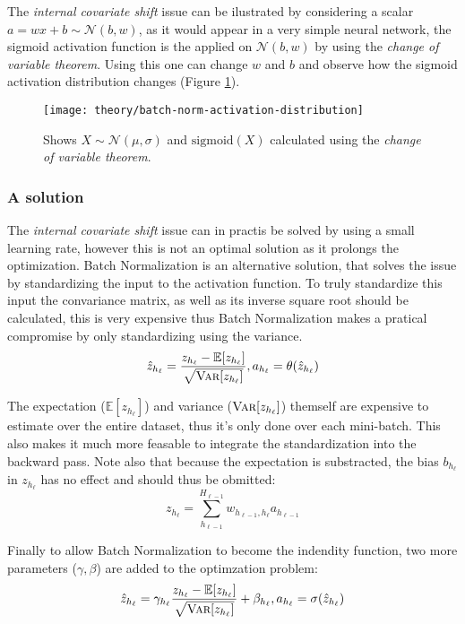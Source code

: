 The \textit{internal covariate shift} issue can be ilustrated by considering a scalar $a = w x + b \sim \mathcal{N}(b, w)$, as it would appear in a very simple neural network, the sigmoid activation function is the applied on $\mathcal{N}(b, w)$ by using the \textit{change of variable theorem}. Using this one can change $w$ and $b$ and observe how the sigmoid activation distribution changes (Figure \ref{fig:batch-norm-activation-distribution}).

\begin{figure}[h]
	\centering
	\texttt{[image: theory/batch-norm-activation-distribution]}
	\caption{Shows $X \sim \mathcal{N}(\mu, \sigma)$ and $\mathrm{sigmoid}(X)$ calculated using the \textit{change of variable theorem}.}
	\label{fig:batch-norm-activation-distribution}
\end{figure}

\subsubsection{A solution}
The \textit{internal covariate shift} issue can in practis be solved by using a small learning rate, however this is not an optimal solution as it prolongs the optimization. Batch Normalization is an alternative solution, that solves the issue by standardizing the input to the activation function. To truly standardize this input the convariance matrix, as well as its inverse square root should be calculated, this is very expensive thus Batch Normalization makes a pratical compromise by only standardizing using the variance.
\begin{equation}
\hat{z}_{h_\ell} = \frac{z_{h_\ell} - \mathbb{E}[z_{h_\ell}]}{\sqrt{\textsc{Var}[z_{h_\ell}]}}, a_{h_\ell} = \theta(\hat{z}_{h_\ell})
\end{equation}

The expectation ($\mathbb{E}[z_{h_\ell}]$) and variance ($\textsc{Var}[z_{h_\ell}]$) themself are expensive to estimate over the entire dataset, thus it's only done over each mini-batch. This also makes it much more feasable to integrate the standardization into the backward pass. Note also that because the expectation is substracted, the bias $b_{h_\ell}$ in $z_{h_\ell}$ has no effect and should thus be obmitted:
\begin{equation}
z_{h_\ell} = \sum_{h_{\ell-1}}^{H_{\ell-1}} w_{h_{\ell-1}, h_\ell} a_{h_{\ell-1}} 
\end{equation}


Finally to allow Batch Normalization to become the indendity function, two more parameters ($\gamma, \beta$) are added to the optimzation problem:
\begin{equation}
\hat{z}_{h_\ell} = \gamma_{h_\ell} \frac{z_{h_\ell} - \mathbb{E}[z_{h_\ell}]}{\sqrt{\textsc{Var}[z_{h_\ell}]}} + \beta_{h_\ell}, a_{h_\ell} = \sigma(\hat{z}_{h_\ell})
\label{eq:theory:convergence:batch-norm}
\end{equation}

